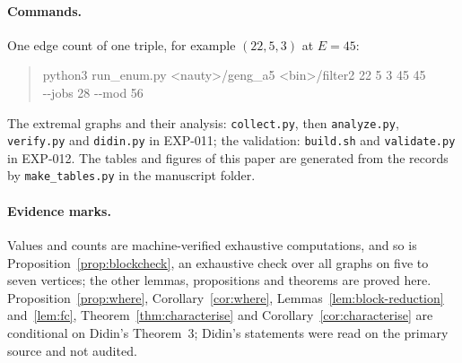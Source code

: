 \documentclass[11pt]{article}
\theoremstyle{definition}
\theoremstyle{remark}
\begin{document}
\paragraph{Commands.} One edge count of one triple, for example $(22,5,3)$ at $E=45$:
\begin{quote}\small\ttfamily
python3 run\_enum.py <nauty>/geng\_a5 <bin>/filter2 22 5 3 45 45\\
\quad -{}-jobs 28 -{}-mod 56
\end{quote}
The extremal graphs and their analysis: \texttt{collect.py}, then \texttt{analyze.py}, \texttt{verify.py} and
\texttt{didin.py} in EXP-011; the validation: \texttt{build.sh} and \texttt{validate.py} in EXP-012. The tables and
figures of this paper are generated from the records by \texttt{make\_tables.py} in the manuscript folder.

\paragraph{Evidence marks.} Values and counts are machine-verified exhaustive computations, and so is
Proposition~\ref{prop:blockcheck}, an exhaustive check over all graphs on five to seven vertices; the other lemmas,
propositions and theorems are proved here. Proposition~\ref{prop:where}, Corollary~\ref{cor:where},
Lemmas~\ref{lem:block-reduction} and~\ref{lem:fc}, Theorem~\ref{thm:characterise} and Corollary~\ref{cor:characterise}
are conditional on Didin's Theorem~3; Didin's statements were read on the primary source and not audited.
\end{document}
